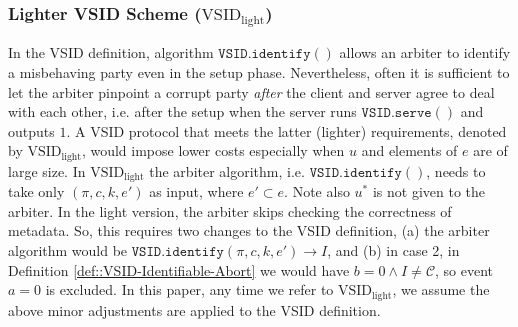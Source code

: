 \subsubsection{Lighter VSID Scheme ($\text{VSID}_{\scriptscriptstyle\text{light}}$)}\label{remark::light-VSID}
In the VSID  definition, algorithm  $\mathtt{VSID.identify}()$    allows an arbiter  to identify a misbehaving party even in the setup phase. Nevertheless, often it is sufficient  to let the arbiter pinpoint a corrupt party \emph{after} the client and server agree to deal with each other, i.e. after the setup when the server runs  $\mathtt{VSID.serve}()$ and outputs $1$. A VSID protocol that meets the latter (lighter) requirements, denoted by $\text{VSID}_{\scriptscriptstyle \text{light}}$, would impose lower costs  especially when $u$ and elements of $e$ are of large size. In $\text{VSID}_{\scriptscriptstyle\text{light}}$  the arbiter algorithm, i.e. $\mathtt{VSID.identify}()$, needs to take only $(\pi, c, k, e')$ as input, where $e'\subset e$. Note also $u^{\scriptscriptstyle *}$ is not given to the arbiter. In the light version, the arbiter   skips  checking the correctness of metadata. So, this requires two changes to the VSID definition, (a) the arbiter algorithm would be   $\mathtt{VSID.identify}(\pi,c,k,e')\rightarrow I$, and (b) in case 2, in Definition \ref{def::VSID-Identifiable-Abort} we would have $b=0\wedge I\neq \mathcal C$, so event $a=0$ is excluded. In this paper, any time we refer to $\text{VSID}_{\scriptscriptstyle\text{light}}$, we assume the above minor adjustments are applied to the VSID definition. 









